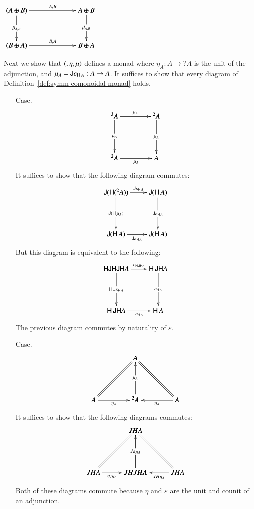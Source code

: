 \documentclass{lmcs}
\let\mto\to
\let\to\relax
\newcommand{\to}{\rightarrow}
\let\r\relax
\let\wn\relax
\newcommand{\func}[1]{\mathsf{#1}}
\newcommand{\r}[1]{\mathsf{r}_{#1}}
\newcommand{\wn}[0]{\mathop{?}}
\newenvironment{diagram}{
  \begin{center}
    \begin{math}
      \bfig
}{
      \efig
    \end{math}
  \end{center}
}
\begin{document}
\begin{diagram}
  \square|amma|/->`->`->`->/<1000,500>[
    \wn (A \oplus B)`
    \wn A \oplus \wn B`
    \wn (B \oplus A)`
    \wn B \oplus \wn A;
    \r{A,B}`
    \wn {\beta}_{A,B}`
        {\beta}_{\wn A,\wn B}`
        \r{B,A}]
\end{diagram}
Next we show that $(\wn,\eta,\mu)$ defines a monad where
$\eta_A : A \mto ?A$ is the unit of the adjunction, and
$\mu_A = \func{J}\varepsilon_{\func{H}\,A} : \wn\wn A \mto \wn A$.  It
suffices to show that every diagram of
Definition~\ref{def:symm-comonoidal-monad} holds.
\begin{itemize}
\item[Case.]
  $$\bfig
  \square|ammb|<600,600>[
    \wn^3 A`
    \wn^2 A`
    \wn^2 A`
    \wn A;
    \mu_{\wn A}`
    \wn\mu_A`
    \mu_A`
    \mu_A]
  \efig$$
  It suffices to show that the following diagram commutes:
  $$\bfig
  \square|ammb|<600,600>[
    \func{J}(\func{H}(\wn^2 A))`
    \func{J}(\func{H}\,\wn A)`
    \func{J}(\func{H}\,\wn A)`
    \func{J}(\func{H}\,A);
    \func{J}\varepsilon_{\func{H}\,\wn A}`
    \func{J}(\func{H}\,\mu_A)`
    \func{J}\varepsilon_{\func{H}\,A}`
    \func{J}\varepsilon_{\func{H}\,A}]
  \efig$$
  But this diagram is equivalent to the following:
  $$\bfig
  \square|ammb|<600,600>[
    \func{H}\func{JHJH} A`
    \func{H}\,\func{JH} A`
    \func{H}\,\func{JH} A`
    \func{H}\,A;
    \varepsilon_{\func{H}\,\func{JH} A}`
    \func{H}\,\func{J}\varepsilon_{\func{H}\,A}`
    \varepsilon_{\func{H}\,A}`
    \varepsilon_{\func{H}\,A}]
  \efig$$
  The previous diagram commutes by naturality of $\varepsilon$.

\item[Case.]
  $$\bfig
  \Atrianglepair/=`<-`=`->`<-/<600,600>[
    \wn A`
    \wn A`
    \wn^2 A`
    \wn A;`
    \mu_A``
    \eta_{\wn A}`
    \wn \eta_A]
  \efig$$
  It suffices to show that the following diagrams commutes:
  $$\bfig
  \Atrianglepair/=`<-`=`->`<-/<600,600>[
    JH A`
    JH A`
    JHJH A`
    JH A;`
    J\varepsilon_{HA}``
    \eta_{JH A}`
    JH \eta_A]
  \efig$$
  Both of these diagrams commute because $\eta$ and $\varepsilon$
  are the unit and counit of an adjunction.
\end{itemize}
\end{document}
